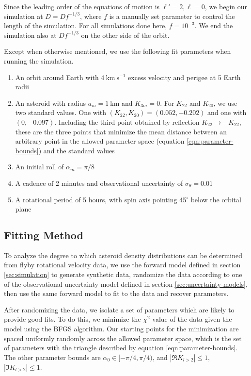 \documentclass[linenumbers]{aastex631}
\newcommand{\siunit}[1]{\ \textrm{#1}}
\newcommand{\per}[1]{\ \textrm{#1}^{-1}}
\begin{document}
Since the leading order of the equations of motion is $\ell' = 2, \ell = 0$, we begin our simulation at $D = D f^{-1/3}$, where $f$ is a manually set parameter to control the length of the simulation. For all simulations done here, $f = 10^{-3}.$ We end the simulation also at $D f^{-1/3}$ on the other side of the orbit.

Except when otherwise mentioned, we use the following fit parameters when running the simulation.
\begin{enumerate}
\item An orbit around Earth with $4\siunit{km}\per{s}$ excess velocity and perigee at 5 Earth radii
\item An asteroid with radius $a_m = 1\siunit{km}$ and $K_{3m}=0$. For $K_{22}$ and $K_{20}$, we use two standard values. One with $(K_{22}, K_{20}) = (0.052, -0.202)$ and one with $(0, -0.097)$. Including the third point obtained by reflection $K_{22}\rightarrow -K_{22}$, these are the three points that minimize the mean distance between an arbitrary point in the allowed parameter space (equation \ref{eqn:parameter-bounds}) and the standard values
\item An initial roll of $\alpha_m=\pi/8$
\item A cadence of 2 minutes and observational uncertainty of $\sigma_\theta = 0.01$
\item A rotational period of 5 hours, with spin axis pointing 45$^\circ$ below the orbital plane
\end{enumerate}



\subsection{Fitting Method}
To analyze the degree to which asteroid density distributions can be determined from flyby rotational velocity data, we use the forward model defined in section \ref{sec:simulation} to generate synthetic data, randomize the data according to one of the observational uncertainty model defined in section \ref{sec:uncertainty-models}, then use the same forward model to fit to the data and recover parameters.

After randomizing the data, we isolate a set of parameters which are likely to provide good fits. To do this, we minimize the $\chi^2$ value of the data given the model using the BFGS algorithm. Our starting points for the minimization are spaced uniformly randomly across the allowed parameter space, which is the set of parameters with the triangle described by equation \ref{eqn:parameter-bounds}. The other parameter bounds are $\alpha_0 \in [-\pi/4, \pi/4)$, and $|\Re K_{l>2}| \leq  1$, $|\Im K_{l>2}| \leq  1$.
\end{document}
